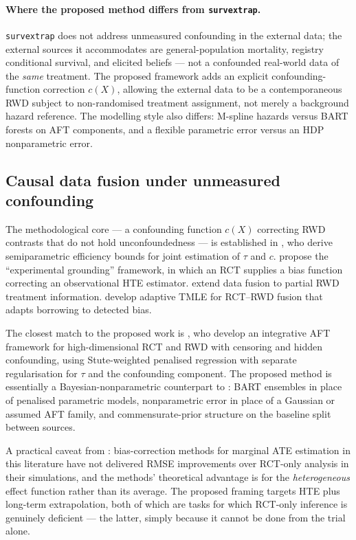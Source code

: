 \documentclass[11pt]{article}
\newcommand{\X}{X}
\newcommand{\tauf}{\tau}
\newcommand{\cf}{c}
\begin{document}
\paragraph{Where the proposed method differs from \texttt{survextrap}.}
\texttt{survextrap} does not address unmeasured confounding in the external
data; the external sources it accommodates are general-population mortality,
registry conditional survival, and elicited beliefs --- not a confounded
real-world data of the \emph{same} treatment. The proposed framework
adds an explicit confounding-function correction $\cf(\X)$, allowing the
external data to be a contemporaneous RWD subject to non-randomised
treatment assignment, not merely a background hazard reference. The
modelling style also differs: M-spline hazards versus BART forests on
AFT components, and a flexible parametric error versus an HDP nonparametric
error.

\subsection{Causal data fusion under unmeasured confounding}

The methodological core --- a confounding function $\cf(\X)$ correcting RWD
contrasts that do not hold unconfoundedness --- is established in
\citet{YangLiuZengWang2025}, who derive semiparametric efficiency bounds for
joint estimation of $\tauf$ and $\cf$. \citet{Kallus2018} propose the
``experimental grounding'' framework, in which an RCT supplies a bias
function correcting an observational HTE estimator. \citet{Yao2024} extend
data fusion to partial RWD treatment information. \citet{vanderLaan2024}
develop adaptive TMLE for RCT--RWD fusion that adapts borrowing to detected
bias.

The closest match to the proposed work is \citet{Ye2025}, who develop an
integrative AFT framework for high-dimensional RCT and RWD with censoring
and hidden confounding, using Stute-weighted penalised regression with
separate regularisation for $\tauf$ and the confounding component. The
proposed method is essentially a Bayesian-nonparametric counterpart to
\citet{Ye2025}: BART ensembles in place of penalised parametric models,
nonparametric error in place of a Gaussian or assumed AFT family, and
commensurate-prior structure on the baseline split between sources.

A practical caveat from \citet{Lin2024}: bias-correction methods for
marginal ATE estimation in this literature have not delivered
RMSE improvements over RCT-only analysis in their simulations, and the
methods' theoretical advantage is for the \emph{heterogeneous} effect
function rather than its average. The proposed framing targets HTE
plus long-term extrapolation, both of which are tasks for which RCT-only
inference is genuinely deficient --- the latter, simply because it cannot
be done from the trial alone.
\end{document}
